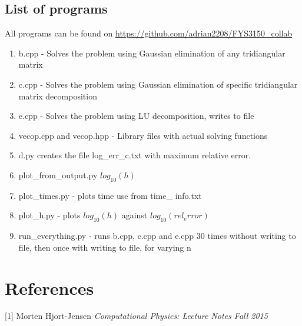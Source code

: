 \documentclass[10pt,a4paper]{article}
\begin{document}
\subsection{List of programs}
All programs can be found on \url{https://github.com/adrian2208/FYS3150_collab}
\begin{enumerate}
\item b.cpp - Solves the problem using Gaussian elimination of any tridiangular matrix
\item c.cpp - Solves the problem using Gaussian elimination of specific tridiangular matrix decomposition
\item e.cpp - Solves the problem using LU decomposition, writes to file
\item vecop.cpp and vecop.hpp - Library files with actual solving functions
\item d.py creates the file log\_err\_c.txt with maximum relative error.
\item plot\_from\_output.py $log_{10}(h)$
\item plot\_times.py - plots time use from time\_
info.txt
\item plot\_h.py - plots $log_{10}(h)$ against $log_{10}(rel_error)$
\item run\_everything.py - runs b.cpp, c.cpp and e.cpp 30 times without writing to file, then once with writing to file, for varying n
\end{enumerate}

\section{References}
[1] Morten Hjort-Jensen \textit{Computational Physics: Lecture Notes Fall 2015}



\begin{comment}

$$
\begin{bmatrix}
0 & 0 & 0 & 0 \\
0 & 0 & 0 & 0 \\
0 & 0 & 0 & 0 \\
0 & 0 & 0 & 0 \\
\end{bmatrix}
$$

\begin{lstlisting}[caption=insert caption]
for (unsigned int i = 0; i<100;i++{
}
\end{lstlisting}

\begin{figure}[h]
\texttt{[image: ]}
\caption{include caption}
\end{figure}

\end{comment}
\end{document}
